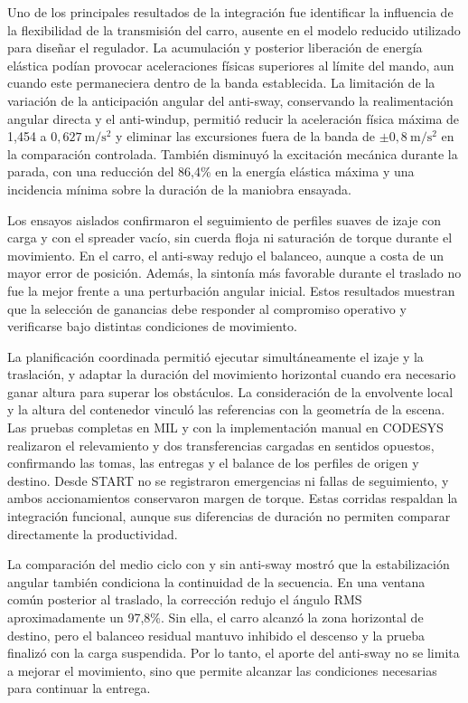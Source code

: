 \documentclass[a4paper,10pt,onecolumn,journal]{ieeeconf}
\numberwithin{equation}{section}
\begin{document}
Uno de los principales resultados de la integración fue identificar la influencia de la flexibilidad de la transmisión del carro, ausente en el modelo reducido utilizado para diseñar el regulador. La acumulación y posterior liberación de energía elástica podían provocar aceleraciones físicas superiores al límite del mando, aun cuando este permaneciera dentro de la banda establecida. La limitación de la variación de la anticipación angular del anti-sway, conservando la realimentación angular directa y el anti-windup, permitió reducir la aceleración física máxima de 1,454 a \(0{,}627\ \mathrm{m/s^2}\) y eliminar las excursiones fuera de la banda de \(\pm 0{,}8\ \mathrm{m/s^2}\) en la comparación controlada. También disminuyó la excitación mecánica durante la parada, con una reducción del 86,4\% en la energía elástica máxima y una incidencia mínima sobre la duración de la maniobra ensayada.

Los ensayos aislados confirmaron el seguimiento de perfiles suaves de izaje con carga y con el spreader vacío, sin cuerda floja ni saturación de torque durante el movimiento. En el carro, el anti-sway redujo el balanceo, aunque a costa de un mayor error de posición. Además, la sintonía más favorable durante el traslado no fue la mejor frente a una perturbación angular inicial. Estos resultados muestran que la selección de ganancias debe responder al compromiso operativo y verificarse bajo distintas condiciones de movimiento.

La planificación coordinada permitió ejecutar simultáneamente el izaje y la traslación, y adaptar la duración del movimiento horizontal cuando era necesario ganar altura para superar los obstáculos. La consideración de la envolvente local y la altura del contenedor vinculó las referencias con la geometría de la escena. Las pruebas completas en MIL y con la implementación manual en CODESYS realizaron el relevamiento y dos transferencias cargadas en sentidos opuestos, confirmando las tomas, las entregas y el balance de los perfiles de origen y destino. Desde START no se registraron emergencias ni fallas de seguimiento, y ambos accionamientos conservaron margen de torque. Estas corridas respaldan la integración funcional, aunque sus diferencias de duración no permiten comparar directamente la productividad.

La comparación del medio ciclo con y sin anti-sway mostró que la estabilización angular también condiciona la continuidad de la secuencia. En una ventana común posterior al traslado, la corrección redujo el ángulo RMS aproximadamente un 97,8\%. Sin ella, el carro alcanzó la zona horizontal de destino, pero el balanceo residual mantuvo inhibido el descenso y la prueba finalizó con la carga suspendida. Por lo tanto, el aporte del anti-sway no se limita a mejorar el movimiento, sino que permite alcanzar las condiciones necesarias para continuar la entrega.
\end{document}
